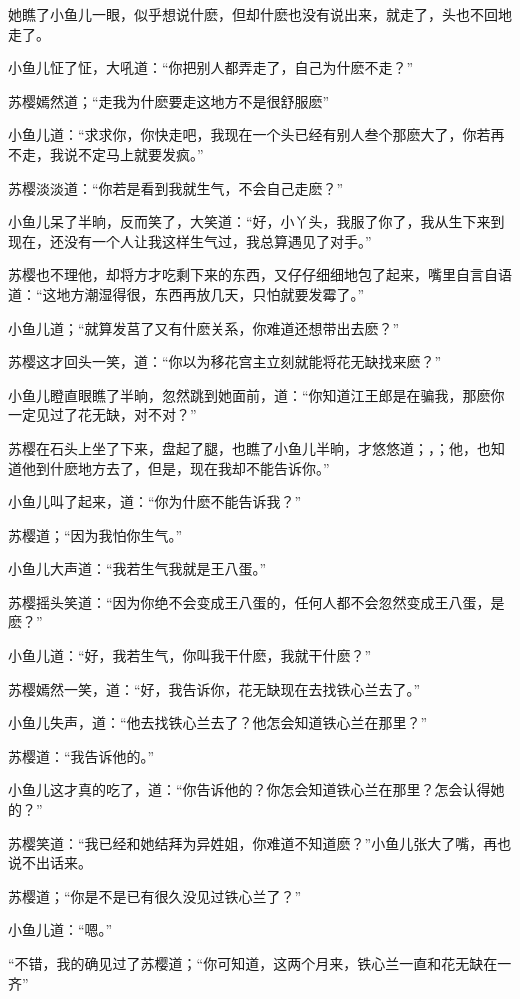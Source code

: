 \documentclass[12pt,oneside]{book}
\begin{document}
她瞧了小鱼儿一眼，似乎想说什麽，但却什麽也没有说出来，就走了，头也不回地走了。

小鱼儿怔了怔，大吼道：``你把别人都弄走了，自己为什麽不走？''

苏樱嫣然道；``走我为什麽要走这地方不是很舒服麽''

小鱼儿道：``求求你，你快走吧，我现在一个头已经有别人叁个那麽大了，你若再不走，我说不定马上就要发疯。''

苏樱淡淡道：``你若是看到我就生气，不会自己走麽？''

小鱼儿呆了半晌，反而笑了，大笑道：``好，小丫头，我服了你了，我从生下来到现在，还没有一个人让我这样生气过，我总算遇见了对手。''

苏樱也不理他，却将方才吃剩下来的东西，又仔仔细细地包了起来，嘴里自言自语道：``这地方潮湿得很，东西再放几天，只怕就要发霉了。''

小鱼儿道；``就算发莒了又有什麽关系，你难道还想带出去麽？''

苏樱这才回头一笑，道：``你以为移花宫主立刻就能将花无缺找来麽？''

小鱼儿瞪直眼瞧了半晌，忽然跳到她面前，道：``你知道江王郎是在骗我，那麽你一定见过了花无缺，对不对？''

苏樱在石头上坐了下来，盘起了腿，也瞧了小鱼儿半晌，才悠悠道；，；他，也知道他到什麽地方去了，但是，现在我却不能告诉你。''

小鱼儿叫了起来，道：``你为什麽不能告诉我？''

苏樱道；``因为我怕你生气。''

小鱼儿大声道：``我若生气我就是王八蛋。''

苏樱摇头笑道：``因为你绝不会变成王八蛋的，任何人都不会忽然变成王八蛋，是麽？''

小鱼儿道：``好，我若生气，你叫我干什麽，我就干什麽？''

苏樱嫣然一笑，道：``好，我告诉你，花无缺现在去找铁心兰去了。''

小鱼儿失声，道：``他去找铁心兰去了？他怎会知道铁心兰在那里？''

苏樱道：``我告诉他的。''

小鱼儿这才真的吃了，道：``你告诉他的？你怎会知道铁心兰在那里？怎会认得她的？''

苏樱笑道：``我已经和她结拜为异姓姐，你难道不知道麽？''小鱼儿张大了嘴，再也说不出话来。

苏樱道；``你是不是已有很久没见过铁心兰了？''

小鱼儿道：``嗯。''

``不错，我的确见过了苏樱道；``你可知道，这两个月来，铁心兰一直和花无缺在一齐''
\end{document}
